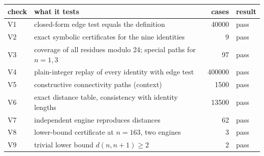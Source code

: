 \begin{tabular}{@{}llrl@{}}
\toprule
check & what it tests & cases & result \\ \midrule
V1 & closed-form edge test equals the definition & 40000 & pass \\
V2 & exact symbolic certificates for the nine identities & 9 & pass \\
V3 & coverage of all residues modulo 24; special paths for $n=1,3$ & 97 & pass \\
V4 & plain-integer replay of every identity with edge test & 400000 & pass \\
V5 & constructive connectivity paths (context) & 1500 & pass \\
V6 & exact distance table, consistency with identity lengths & 13500 & pass \\
V7 & independent engine reproduces distances & 62 & pass \\
V8 & lower-bound certificate at $n=163$, two engines & 3 & pass \\
V9 & trivial lower bound $d(n,n+1)\ge 2$ & 2 & pass \\
\bottomrule
\end{tabular}
